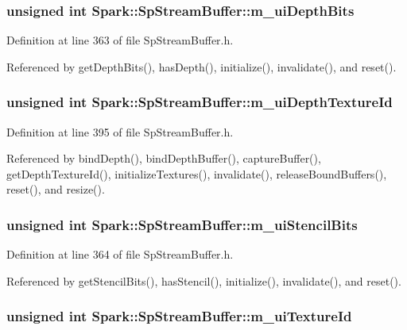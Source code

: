\subsubsection{\setlength{\rightskip}{0pt plus 5cm}unsigned int {\bf Spark::Sp\-Stream\-Buffer::m\_\-ui\-Depth\-Bits}\hspace{0.3cm}{\tt  [protected]}}\label{classSpark_1_1SpStreamBuffer_p12}


Definition at line 363 of file Sp\-Stream\-Buffer.h.

Referenced by get\-Depth\-Bits(), has\-Depth(), initialize(), invalidate(), and reset().
\subsubsection{\setlength{\rightskip}{0pt plus 5cm}unsigned int {\bf Spark::Sp\-Stream\-Buffer::m\_\-ui\-Depth\-Texture\-Id}\hspace{0.3cm}{\tt  [protected]}}\label{classSpark_1_1SpStreamBuffer_p28}


Definition at line 395 of file Sp\-Stream\-Buffer.h.

Referenced by bind\-Depth(), bind\-Depth\-Buffer(), capture\-Buffer(), get\-Depth\-Texture\-Id(), initialize\-Textures(), invalidate(), release\-Bound\-Buffers(), reset(), and resize().
\subsubsection{\setlength{\rightskip}{0pt plus 5cm}unsigned int {\bf Spark::Sp\-Stream\-Buffer::m\_\-ui\-Stencil\-Bits}\hspace{0.3cm}{\tt  [protected]}}\label{classSpark_1_1SpStreamBuffer_p13}


Definition at line 364 of file Sp\-Stream\-Buffer.h.

Referenced by get\-Stencil\-Bits(), has\-Stencil(), initialize(), invalidate(), and reset().
\subsubsection{\setlength{\rightskip}{0pt plus 5cm}unsigned int {\bf Spark::Sp\-Stream\-Buffer::m\_\-ui\-Texture\-Id}\hspace{0.3cm}{\tt  [protected]}}\label{classSpark_1_1SpStreamBuffer_p27}


